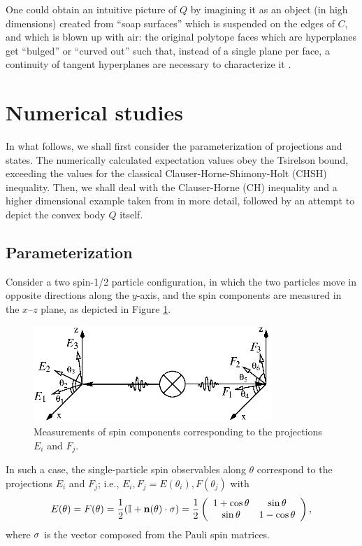 One could obtain an intuitive picture of $Q$ by imagining
it as an object (in high dimensions) created from ``soap surfaces''
which is suspended on the edges of
$C$, and which is blown up with air: the original polytope
faces which are hyperplanes get ``bulged''
or ``curved out'' such that,
instead of a single plane
per face,
a continuity of tangent hyperplanes are
necessary to characterize it
\cite{khalfin-97}.

\section{Numerical studies}

In what follows, we shall first consider
the parameterization of projections and states.
The numerically calculated expectation values obey
the Tsirelson bound, exceeding the
values for the classical Clauser-Horne-Shimony-Holt (CHSH) inequality.
Then, we shall deal with the Clauser-Horne (CH) inequality and a higher
dimensional example taken from \cite{2000-poly} in more detail,
followed by an attempt to depict the convex body $Q$ itself.

\subsection{Parameterization}

Consider a two spin-1/2 particle configuration,
in which the two particles move in opposite directions along the $y$-axis,
and the spin components are measured in the $x$--$z$ plane,
as depicted in Figure \ref{f-2003-qpoly-1}.
\begin{figure}%
  \centering
\includegraphics[width=90mm]{2003-qpoly-eifj}
  \caption{Measurements of spin components corresponding to the projections  ${E}_i$ and ${F}_j$.}
  \label{f-2003-qpoly-1}
\end{figure}
In such a case, the single-particle
 spin observables along $\theta$ correspond to the projections
$E_{i}$ and $F_{j}$; i.e., $E_i,F_j=E(\theta_i),F(\theta_j)$ with
\begin{equation}
  \label{e-2003-qpoly-1}
E(\theta )=F(\theta )=\frac{1}{2}({\Bbb I} +{\bf n}(\theta)\cdot{\bf \sigma})=
\frac{1}{2}\left(
  \begin{array}{cc}
    1 + \cos\theta& \sin\theta\\
    \sin\theta&1 - \cos\theta
    \end{array}
\right),
\end{equation}
where ${\bf \sigma}$ is the vector composed from the Pauli spin matrices.

